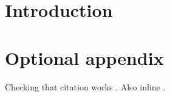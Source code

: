 \documentclass[12pt]{report}
\begin{document}

\tableofcontents


\chapter{Introduction}


\appendix
\chapter{Optional appendix}

Checking that citation works \citep{agarwal_reincarnating_2022}.
Also inline \citet{abbeel_apprenticeship_2004}.



\end{document}
